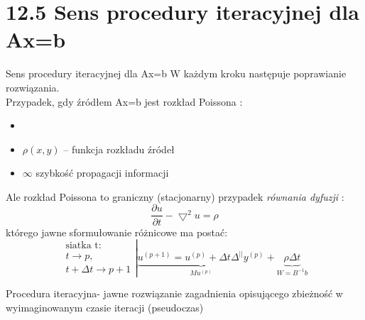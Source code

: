 \section{12.5 Sens procedury iteracyjnej dla Ax=b}

\begin{frame}{Sens procedury iteracyjnej dla Ax=b}
  W każdym kroku następuje poprawianie rozwiązania.\\
  Przypadek, gdy źródłem Ax=b jest rozkład Poissona :
  \begin{itemize}
    \item {}
    \item $\rho(x,y)$ -- funkcja rozkładu źródeł
    \item $\infty$ szybkość propagacji informacji
  \end{itemize}
\end{frame}

\begin{frame}{}
  Ale rozkład Poissona to graniczny (stacjonarny) przypadek \emph{równania dyfuzji} :
  $$\boxed{\frac{\partial u}{\partial t} - \bigtriangledown^2u=\rho}$$
  którego jawne sformułowanie różnicowe ma postać:
  $$
  \left.
  \begin{array}{lr}
    \text{siatka t}:\\
    t\rightarrow p,\\
    t+\Delta t\rightarrow p+1
  \end{array}\right|
  \underbrace{u^{(p+1)}=u^{(p)}+\Delta t\Delta^{||}y^{(p)}}_{Mu^{(p)}}+\underbrace{\rho\Delta t}_{W=B^{-1}b}
  $$
  

  Procedura iteracyjna- jawne rozwiązanie zagadnienia opisującego zbieżność w wyimaginowanym czasie iteracji (pseudoczas)
\end{frame}


